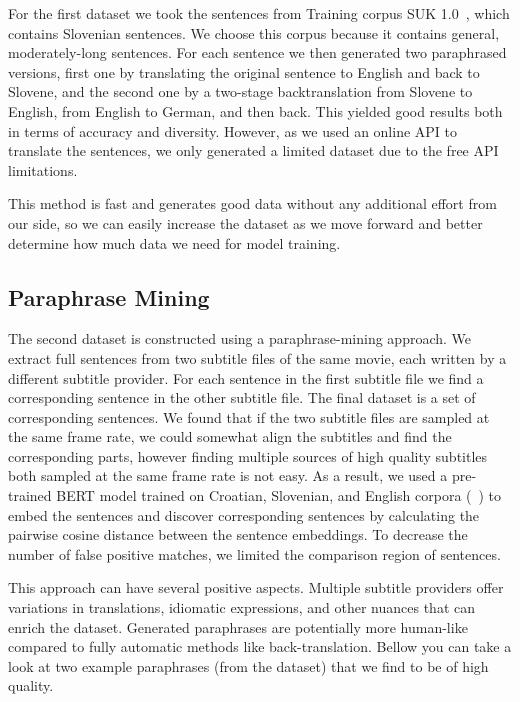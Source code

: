 \documentclass[fleqn,moreauthors,10pt]{ds_report}
\begin{document}
For the first dataset we took the sentences from {Training corpus SUK 1.0}~\cite{11356/1747}, which contains  Slovenian sentences. We choose this corpus because it contains general, moderately-long sentences. For each sentence we then generated two paraphrased versions, first one by translating the original sentence to English and back to Slovene, and the second one by a two-stage backtranslation from Slovene to English, from English to German, and then back. This yielded good results both in terms of accuracy and diversity. However, as we used an online API to translate the sentences, we only generated a limited dataset due to the free API limitations.

This method is fast and generates good data without any additional effort from our side, so we can easily increase the dataset as we move forward and better determine how much data we need for model training.


\subsection{Paraphrase Mining}

The second dataset is constructed using a paraphrase-mining approach. We extract full sentences from two subtitle files of the same movie, each written by a different subtitle provider. For each sentence in the first subtitle file we find a corresponding sentence in the other subtitle file. The final dataset is a set of corresponding sentences. We found that if the two subtitle files are sampled at the same frame rate, we could somewhat align the subtitles and find the corresponding parts, however finding multiple sources of high quality subtitles both sampled at the same frame rate is not easy. As a result, we used a pre-trained BERT model trained on Croatian, Slovenian, and English corpora (~\cite{11356/1694}) to embed the sentences and discover corresponding sentences by calculating the pairwise cosine distance between the sentence embeddings. To decrease the number of false positive matches, we limited the comparison region of sentences. 

This approach can have several positive aspects. Multiple subtitle providers offer variations in translations, idiomatic expressions, and other nuances that can enrich the dataset. Generated paraphrases are potentially more human-like compared to fully automatic methods like back-translation. Bellow you can take a look at two example paraphrases (from the dataset) that we find to be of high quality.
\end{document}
